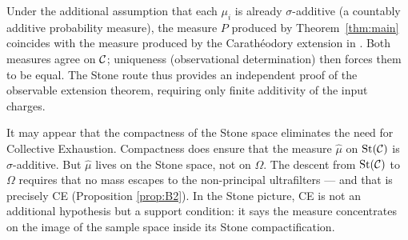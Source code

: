 \begin{remark}
Under the additional assumption that each $\mu_i$ is already $\sigma$-additive (a
countably additive probability measure), the measure $P$ produced by
Theorem~\ref{thm:main} coincides with the measure produced by the Carath\'{e}odory
extension in \cite{mahon_paper0}.  Both measures agree on $\mathcal{C}$; uniqueness
(observational determination) then forces them to be equal.  The Stone route thus
provides an independent proof of the observable extension theorem, requiring only
finite additivity of the input charges.
\end{remark}

\begin{remark}
It may appear that the compactness of the Stone space eliminates the need for
Collective Exhaustion.  Compactness does ensure that the measure $\hat{\mu}$ on
$\mathrm{St}(\mathcal{C})$ is $\sigma$-additive.  But $\hat{\mu}$ lives on the Stone space, not
on $\Omega$.  The descent from $\mathrm{St}(\mathcal{C})$ to $\Omega$ requires that no mass
escapes to the non-principal ultrafilters --- and that is precisely CE (Proposition
\ref{prop:B2}).  In the Stone picture, CE is not an additional hypothesis but a
support condition: it says the measure concentrates on the image of the sample space
inside its Stone compactification.
\end{remark}



